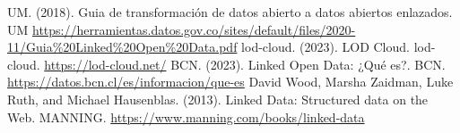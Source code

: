 \documentclass[11pt]{report}
\begin{document}
\begin{thebibliography}{99}
	 UM. (2018). Guia de transformación de datos abierto a datos abiertos enlazados. UM \url{https://herramientas.datos.gov.co/sites/default/files/2020-11/Guia%20Linked%20Open%20Data.pdf}
	 lod-cloud. (2023). LOD Cloud. lod-cloud. \url{https://lod-cloud.net/}
	 BCN. (2023). Linked Open Data: ¿Qué es?. BCN. \url{https://datos.bcn.cl/es/informacion/que-es}
	 David Wood, Marsha Zaidman, Luke Ruth, and Michael Hausenblas. (2013). Linked Data: Structured data on the Web. MANNING. \url{https://www.manning.com/books/linked-data}
\end{thebibliography}
\end{document}
